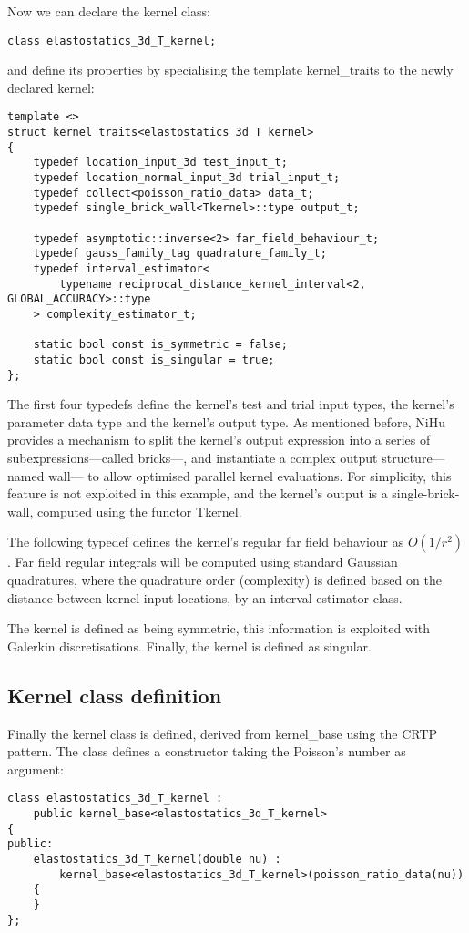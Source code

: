 \documentclass{article}
\begin{document}
Now we can declare the kernel class:
%
\begin{lstlisting}
class elastostatics_3d_T_kernel;
\end{lstlisting}
%
and define its properties by specialising the template kernel\_traits to the newly declared kernel:
%
\begin{lstlisting}
template <>
struct kernel_traits<elastostatics_3d_T_kernel>
{
	typedef location_input_3d test_input_t;
	typedef location_normal_input_3d trial_input_t;
	typedef collect<poisson_ratio_data> data_t;
	typedef single_brick_wall<Tkernel>::type output_t;
	
	typedef asymptotic::inverse<2> far_field_behaviour_t;
	typedef gauss_family_tag quadrature_family_t;
	typedef interval_estimator<
		typename reciprocal_distance_kernel_interval<2, GLOBAL_ACCURACY>::type
	> complexity_estimator_t;
	
	static bool const is_symmetric = false;
	static bool const is_singular = true;
};
\end{lstlisting}
%
The first four typedefs define the kernel's test and trial input types, the kernel's parameter data type and the kernel's output type.
As mentioned before, NiHu provides a mechanism to split the kernel's output expression into a series of subexpressions---called bricks---, and instantiate a complex output structure---named wall--- to allow optimised parallel kernel evaluations.
For simplicity, this feature is not exploited in this example, and the kernel's output is a single-brick-wall, computed using the functor Tkernel.

The following typedef defines the kernel's regular far field behaviour as $O(1/r^2)$.
Far field regular integrals will be computed using standard Gaussian quadratures, where the quadrature order (complexity) is defined based on the distance between kernel input locations, by an interval estimator class.

The kernel is defined as being symmetric, this information is exploited with Galerkin discretisations.
Finally, the kernel is defined as singular.

\subsection{Kernel class definition}

Finally the kernel class is defined, derived from kernel\_base using the CRTP pattern. The class defines a constructor taking the Poisson's number as argument:
%
\begin{lstlisting}
class elastostatics_3d_T_kernel :
	public kernel_base<elastostatics_3d_T_kernel>
{
public:
	elastostatics_3d_T_kernel(double nu) :
		kernel_base<elastostatics_3d_T_kernel>(poisson_ratio_data(nu))
	{
	}
};
\end{lstlisting}
\end{document}
